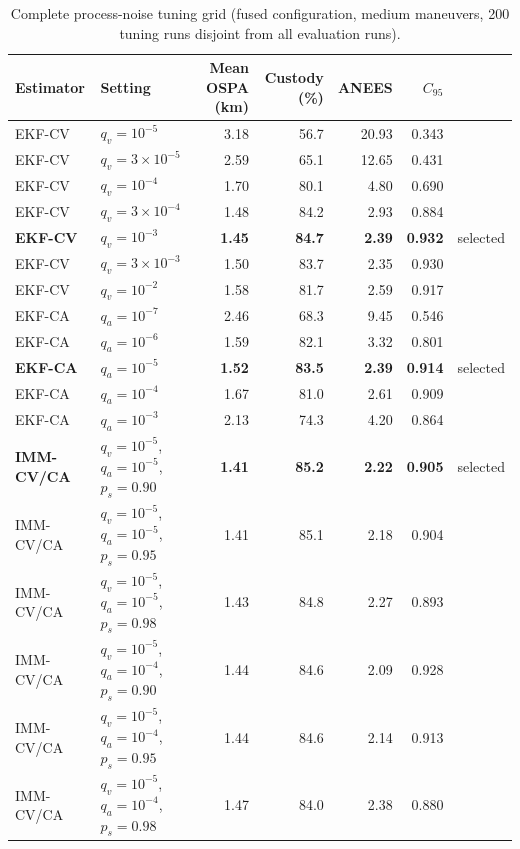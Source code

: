 \begin{table}[!htbp]
\caption{Complete process-noise tuning grid (fused configuration, medium maneuvers, 200 tuning runs disjoint from all evaluation runs).}
\label{tab:S10}
\centering\footnotesize\setlength{\tabcolsep}{4pt}
\begin{tabular}{@{}llrrrrl@{}}
\toprule
Estimator & Setting & Mean OSPA (km) & Custody (\%) & ANEES & $C_{95}$ & \\
\midrule
EKF-CV & $q_v = 10^{-5}$ & 3.18 & 56.7 & 20.93 & 0.343 &  \\
EKF-CV & $q_v = 3\times10^{-5}$ & 2.59 & 65.1 & 12.65 & 0.431 &  \\
EKF-CV & $q_v = 10^{-4}$ & 1.70 & 80.1 & 4.80 & 0.690 &  \\
EKF-CV & $q_v = 3\times10^{-4}$ & 1.48 & 84.2 & 2.93 & 0.884 &  \\
\textbf{EKF-CV} & $q_v = 10^{-3}$ & \textbf{1.45} & \textbf{84.7} & \textbf{2.39} & \textbf{0.932} & selected \\
EKF-CV & $q_v = 3\times10^{-3}$ & 1.50 & 83.7 & 2.35 & 0.930 &  \\
EKF-CV & $q_v = 10^{-2}$ & 1.58 & 81.7 & 2.59 & 0.917 &  \\
\midrule
EKF-CA & $q_a = 10^{-7}$ & 2.46 & 68.3 & 9.45 & 0.546 &  \\
EKF-CA & $q_a = 10^{-6}$ & 1.59 & 82.1 & 3.32 & 0.801 &  \\
\textbf{EKF-CA} & $q_a = 10^{-5}$ & \textbf{1.52} & \textbf{83.5} & \textbf{2.39} & \textbf{0.914} & selected \\
EKF-CA & $q_a = 10^{-4}$ & 1.67 & 81.0 & 2.61 & 0.909 &  \\
EKF-CA & $q_a = 10^{-3}$ & 2.13 & 74.3 & 4.20 & 0.864 &  \\
\midrule
\textbf{IMM-CV/CA} & $q_v = 10^{-5}$, $q_a = 10^{-5}$, $p_s = 0.90$ & \textbf{1.41} & \textbf{85.2} & \textbf{2.22} & \textbf{0.905} & selected \\
IMM-CV/CA & $q_v = 10^{-5}$, $q_a = 10^{-5}$, $p_s = 0.95$ & 1.41 & 85.1 & 2.18 & 0.904 &  \\
IMM-CV/CA & $q_v = 10^{-5}$, $q_a = 10^{-5}$, $p_s = 0.98$ & 1.43 & 84.8 & 2.27 & 0.893 &  \\
IMM-CV/CA & $q_v = 10^{-5}$, $q_a = 10^{-4}$, $p_s = 0.90$ & 1.44 & 84.6 & 2.09 & 0.928 &  \\
IMM-CV/CA & $q_v = 10^{-5}$, $q_a = 10^{-4}$, $p_s = 0.95$ & 1.44 & 84.6 & 2.14 & 0.913 &  \\
IMM-CV/CA & $q_v = 10^{-5}$, $q_a = 10^{-4}$, $p_s = 0.98$ & 1.47 & 84.0 & 2.38 & 0.880 &  \\

\end{tabular}
\end{table}
